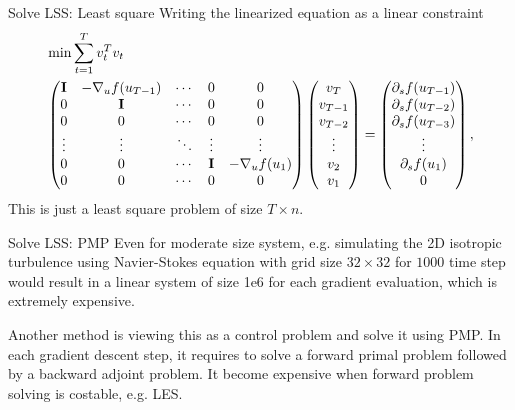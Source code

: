 \documentclass{beamer}
\begin{document}
\begin{frame}{Solve LSS: Least square}
	Writing the linearized equation as a linear constraint
	\begin{equation}\label{equ:lss}
		\begin{aligned}
			& \min \sum_{t=1}^T v_t^T v_t \\
		&\begin{pmatrix}
			\mathbf{I} & -\nabla_u f(u_{T-1}) & \cdots & 0 & 0 \\
			0 & \mathbf{I} & \cdots & 0 & 0 \\
			0 & 0 & \cdots & 0 & 0 \\
			\vdots & \vdots & \ddots & \vdots & \vdots \\
			0 & 0 & \cdots & \mathbf{I} & -\nabla_u f(u_1)	\\
			0 & 0 & \cdots & 0 & 0
		\end{pmatrix}\begin{pmatrix}
			v_T \\ v_{T-1} \\ v_{T-2} \\ \vdots \\ v_2 \\ v_1
		\end{pmatrix} = \begin{pmatrix}
			\partial_s f(u_{T-1}) \\ \partial_s f(u_{T-2}) \\ \partial_s f(u_{T-3}) \\ \vdots \\ \partial_s f(u_{1}) \\ 0
		\end{pmatrix},
	\end{aligned}
	\end{equation}
	This is just a least square problem of size $T \times n$.
\end{frame}

\begin{frame}{Solve LSS: PMP}
	Even for moderate size system, e.g. simulating the 2D isotropic turbulence using Navier-Stokes equation with 
	grid size $32\times 32$ for $1000$ time step would result in a linear system of size 
	1e6 for each gradient evaluation, which is extremely expensive.
	
	Another method is viewing this as a control problem and solve it using PMP. In each gradient descent step,
	it requires to solve a forward primal problem followed by a backward adjoint problem. It become expensive 
	when forward problem solving is costable, e.g. LES.
\end{frame}
\end{document}
